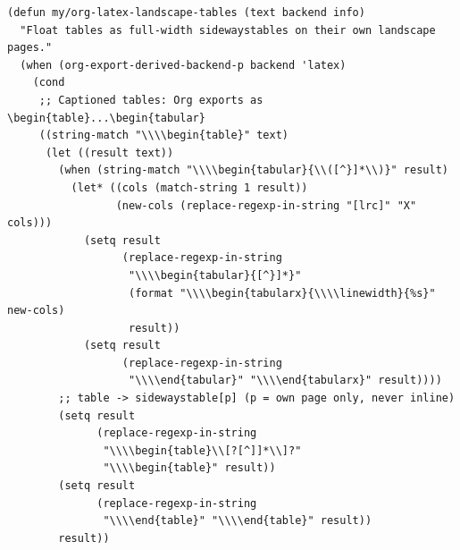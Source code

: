 \begin{verbatim}
(defun my/org-latex-landscape-tables (text backend info)
  "Float tables as full-width sidewaystables on their own landscape pages."
  (when (org-export-derived-backend-p backend 'latex)
    (cond
     ;; Captioned tables: Org exports as \begin{table}...\begin{tabular}
     ((string-match "\\\\begin{table}" text)
      (let ((result text))
        (when (string-match "\\\\begin{tabular}{\\([^}]*\\)}" result)
          (let* ((cols (match-string 1 result))
                 (new-cols (replace-regexp-in-string "[lrc]" "X" cols)))
            (setq result
                  (replace-regexp-in-string
                   "\\\\begin{tabular}{[^}]*}"
                   (format "\\\\begin{tabularx}{\\\\linewidth}{%s}" new-cols)
                   result))
            (setq result
                  (replace-regexp-in-string
                   "\\\\end{tabular}" "\\\\end{tabularx}" result))))
        ;; table -> sidewaystable[p] (p = own page only, never inline)
        (setq result
              (replace-regexp-in-string
               "\\\\begin{table}\\[?[^]]*\\]?"
               "\\\\begin{table}" result))
        (setq result
              (replace-regexp-in-string
               "\\\\end{table}" "\\\\end{table}" result))
        result))


\end{verbatim}
